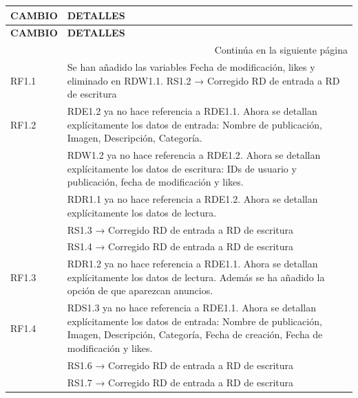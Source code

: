 \begin{longtable}{|p{3cm}|p{11cm}|}
\hline
\textbf{CAMBIO} & \textbf{DETALLES} \\
\hline
\endfirsthead

\hline
\textbf{CAMBIO} & \textbf{DETALLES} \\
\hline
\endhead

\hline 
\multicolumn{2}{r}{Continúa en la siguiente página}\\
\hline 
\endfoot

\endlastfoot

RF1.1 & Se han añadido las variables Fecha de modificación, likes y eliminado en RDW1.1.
RS1.2 → Corregido RD de entrada a RD de escritura \\
\hline

RF1.2 & RDE1.2 ya no hace referencia a RDE1.1. Ahora se detallan explícitamente los datos de entrada: Nombre de publicación, Imagen, Descripción, Categoría.\\

      & RDW1.2 ya no hace referencia a RDE1.2. Ahora se detallan explícitamente los datos de escritura: IDs de usuario y publicación, fecha de modificación y likes.\\

      & RDR1.1 ya no hace referencia a RDE1.2. Ahora se detallan explícitamente los datos de lectura.\\

      & RS1.3 → Corregido RD de entrada a RD de escritura\\
      & RS1.4 → Corregido RD de entrada a RD de escritura\\
\hline

RF1.3 & RDR1.2 ya no hace referencia a RDE1.1. Ahora se detallan explícitamente los datos de lectura. Además se ha añadido la opción de que aparezcan anuncios.\\
\hline

RF1.4 & RDS1.3 ya no hace referencia a RDE1.1. Ahora se detallan explícitamente los datos de entrada: Nombre de publicación, Imagen, Descripción, Categoría, Fecha de creación, Fecha de modificación y likes.\\

      & RS1.6 → Corregido RD de entrada a RD de escritura\\
      & RS1.7 → Corregido RD de entrada a RD de escritura\\
\hline


\end{longtable}

